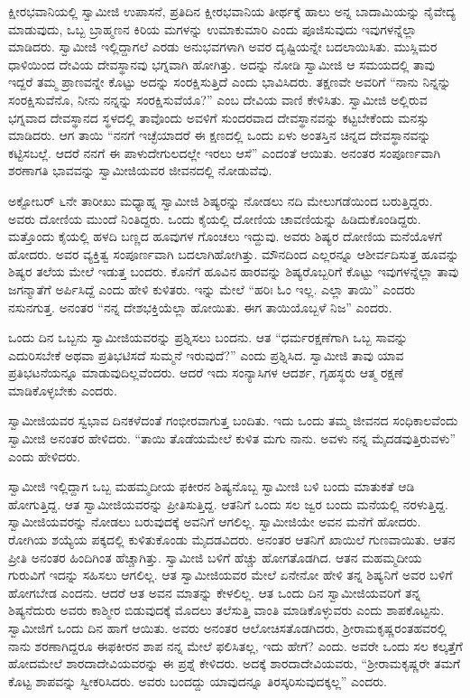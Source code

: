 \vskip 2pt

 ಕ್ಷೀರಭವಾನಿಯಲ್ಲಿ ಸ್ವಾಮೀಜಿ ಉಪಾಸನೆ, ಪ್ರತಿದಿನ ಕ್ಷೀರಭವಾನಿಯ ತೀರ್ಥಕ್ಕೆ ಹಾಲು ಅನ್ನ ಬಾದಾಮಿಯನ್ನು ನೈವೇದ್ಯ ಮಾಡುವುದು, ಒಬ್ಬ ಬ್ರಾಹ್ಮಣನ ಕಿರಿಯ ಮಗಳನ್ನು ಉಮಾಕುಮಾರಿ ಎಂದು ಪೂಜಿಸುವುದು ಇವುಗಳನ್ನೆಲ್ಲಾ ಮಾಡಿದರು. ಸ್ವಾಮೀಜಿ ಇಲ್ಲಿದ್ದಾಗಲೆ ಎರಡು ಅನುಭವಗಳಾಗಿ ಅವರ ದೃಷ್ಟಿಯನ್ನೇ ಬದಲಾಯಿಸಿತು. ಮುಸ್ಲಿಮರ ಧಾಳಿಯಿಂದ ದೇವಿಯ ದೇವಸ್ಥಾನವು ಭಗ್ನವಾಗಿ ಹೋಗಿತ್ತು. ಅದನ್ನು ನೋಡಿ ಸ್ವಾಮೀಜಿ ಆ ಸಮಯದಲ್ಲಿ ತಾವು ಇದ್ದರೆ ತಮ್ಮ ಪ್ರಾಣವನ್ನೇ ಕೊಟ್ಟು ಅದನ್ನು ಸಂರಕ್ಷಿಸುತ್ತಿದೆ ಎಂದು ಭಾವಿಸಿದರು. ತಕ್ಷಣವೇ ಅವರಿಗೆ “ನಾನು ನಿನ್ನನ್ನು ಸಂರಕ್ಷಿಸುವೆನೊ, ನೀನು ನನ್ನನ್ನು ಸಂರಕ್ಷಿಸುವೆಯೊ?” ಎಂಬ ದೇವಿಯ ವಾಣಿ ಕೇಳಿಸಿತು. ಸ್ವಾಮೀಜಿ ಅಲ್ಲಿರುವ ಭಗ್ನವಾದ ದೇವಸ್ಥಾನದ ಸ್ಥಳದಲ್ಲಿ ತಾವೊಂದು ಅವಳಿಗೆ ಸುಂದರವಾದ ದೇವಸ್ಥಾನವನ್ನು ಕಟ್ಟಬೇಕೆಂದು ಮನಸ್ಸು ಮಾಡಿದರು. ಆಗ ತಾಯಿ “ನನಗೆ ಇಚ್ಛೆಯಾದರೆ ಈ ಕ್ಷಣದಲ್ಲಿ ಒಂದು ಏಳು ಅಂತಸ್ತಿನ ಚಿನ್ನದ ದೇವಸ್ಥಾನವನ್ನು ಕಟ್ಟಿಸಬಲ್ಲೆ. ಆದರೆ ನನಗೆ ಈ ಪಾಳುದೇಗುಲದಲ್ಲೇ ಇರಲು ಆಸೆ” ಎಂದಂತೆ ಆಯಿತು. ಅನಂತರ ಸಂಪೂರ್ಣವಾಗಿ ಶರಣಾಗತಿ ಭಾವವನ್ನು ಸ್ವಾಮೀಜಿಯವರ ಜೀವನದಲ್ಲಿ ನೋಡುವೆವು. 

\newpage

 ಅಕ್ಟೋಬರ್ ೬ನೇ ತಾರೀಖು ಮಧ್ಯಾಹ್ನ ಸ್ವಾಮೀಜಿ ಶಿಷ್ಯರನ್ನು ನೋಡಲು ನದಿ ಮೇಲುಗಡೆಯಿಂದ ಬರುತ್ತಿದ್ದರು. ಅವರು ದೋಣಿಯ ಮುಂದೆ ನಿಂತಿದ್ದರು. ಒಂದು ಕೈಯಲ್ಲಿ ದೋಣಿಯ ಚಾವಣಿಯನ್ನು ಹಿಡಿದುಕೊಂಡಿದ್ದರು. ಮತ್ತೊಂದು ಕೈಯಲ್ಲಿ ಹಳದಿ ಬಣ್ಣದ ಹೂವುಗಳ ಗೊಂಚಲು ಇದ್ದುವು. ಅವರು ಶಿಷ್ಯರ ದೋಣಿಯ ಮನೆಯೊಳಗೆ ಹೋದರು. ಅವರ ವ್ಯಕ್ತಿತ್ವ ಸಂಪೂರ್ಣವಾಗಿ ಬದಲಾಗಿಹೋಗಿತ್ತು. ಮೌನದಿಂದ ಎಲ್ಲರನ್ನೂ ಆಶೀರ್ವದಿಸುತ್ತ ಹೂವನ್ನು ಶಿಷ್ಯರ ತಲೆಯ ಮೇಲೆ ಇಡುತ್ತ ಬಂದರು. ಕೊನೆಗೆ ಹೂವಿನ ಹಾರವನ್ನು ಶಿಷ್ಯರೊಬ್ಬರಿಗೆ ಕೊಟ್ಟು ಇವುಗಳನ್ನೆಲ್ಲಾ ತಾವು ಜಗನ್ಮಾತೆಗೆ ಅರ್ಪಿಸಿದ್ದೆ ಎಂದು ಹೇಳಿ ಕುಳಿತರು. ಇನ್ನು ಮೇಲೆ “ಹರಿಃ ಓಂ ಇಲ್ಲ. ಎಲ್ಲಾ ತಾಯಿ” ಎಂದರು ನಸುನಗುತ್ತ. ಅನಂತರ “ನನ್ನ ದೇಶಭಕ್ತಿಯೆಲ್ಲಾ ಹೋಯಿತು. ಈಗ ತಾಯಿಯೊಬ್ಬಳೆ ನಿಜ” ಎಂದರು. 

 ಒಂದು ದಿನ ಒಬ್ಬನು ಸ್ವಾಮೀಜಿಯವರನ್ನು ಪ್ರಶ್ನಿಸಲು ಬಂದನು. ಆತ “ಧರ್ಮರಕ್ಷಣೆಗಾಗಿ ಒಬ್ಬ ಸಾವನ್ನು ಎದುರಿಸಬೇಕೆ ಅಥವಾ ಪ್ರತಿಭಟಿಸದೆ ಸುಮ್ಮನೆ ಇರುವುದೆ?” ಎಂದು ಪ್ರಶ್ನಿಸಿದ. ಸ್ವಾಮೀಜಿ ತಾವು ಯಾವ ಪ್ರತಿಭಟನೆಯನ್ನೂ ಮಾಡುವುದಿಲ್ಲವೆಂದರು. ಆದರೆ ಇದು ಸಂನ್ಯಾಸಿಗಳ ಆದರ್ಶ, ಗೃಹಸ್ಥರು ಆತ್ಮ ರಕ್ಷಣೆ ಮಾಡಿಕೊಳ್ಳಬೇಕು ಎಂದರು. 

 ಸ್ವಾಮೀಜಿಯವರ ಸ್ವಭಾವ ದಿನಕಳೆದಂತೆ ಗಂಭೀರವಾಗುತ್ತ ಬಂದಿತು. ಇದು ಒಂದು ತಮ್ಮ ಜೀವನದ ಸಂಧಿಕಾಲವೆಂದು ಸ್ವಾಮೀಜಿ ಅನಂತರ ಹೇಳಿದರು. “ತಾಯಿ ತೊಡೆಯಮೇಲೆ ಕುಳಿತ ಮಗು ನಾನು. ಅವಳು ನನ್ನ ಮೈದಡವುತ್ತಿರುವಳು” ಎಂದು ಹೇಳಿದರು. 

 ಸ್ವಾಮೀಜಿ ಇಲ್ಲಿದ್ದಾಗ ಒಬ್ಬ ಮಹಮ್ಮದೀಯ ಫಕೀರನ ಶಿಷ್ಯನೊಬ್ಬ ಸ್ವಾಮೀಜಿ ಬಳಿ ಬಂದು ಮಾತುಕತೆ ಆಡಿ ಹೋಗುತ್ತಿದ್ದ. ಆತ ಸ್ವಾಮೀಜಿಯವರನ್ನು ಪ್ರೀತಿಸುತ್ತಿದ್ದ. ಆತನಿಗೆ ಒಂದು ಸಲ ಜ್ವರ ಬಂದು ಮನೆಯಲ್ಲಿ ನರಳುತ್ತಿದ್ದ. ಸ್ವಾಮೀಜಿಯವರನ್ನು ನೋಡಲು ಬರುವುದಕ್ಕೆ ಅವನಿಗೆ ಆಗಲಿಲ್ಲ. ಸ್ವಾಮೀಜಿಯೇ ಅವನ ಮನೆಗೆ ಹೋದರು. ರೋಗಿಯ ಶಯ್ಯೆಯ ಪಕ್ಕದಲ್ಲಿ ಕುಳಿತುಕೊಂಡು ಮೈದಡವಿದರು. ಅನಂತರ ಆತನಿಗೆ ಖಾಯಿಲೆ ಗುಣವಾಯಿತು. ಆತನ ಪ್ರೀತಿ ಅನಂತರ ಹಿಂದಿಗಿಂತ ಹೆಚ್ಚಾಗಿತ್ತು. ಸ್ವಾಮೀಜಿ ಬಳಿಗೆ ಹೆಚ್ಚು ಹೋಗತೊಡಗಿದ. ಆತನ ಮಹಮ್ಮದೀಯ ಗುರುವಿಗೆ ಇದನ್ನು ಸಹಿಸಲು ಆಗಲಿಲ್ಲ. ಆತ ಸ್ವಾಮೀಜಿಯವರ ಮೇಲೆ ಏನೇನೋ ಹೇಳಿ ತನ್ನ ಶಿಷ್ಯನಿಗೆ ಅವರ ಬಳಿಗೆ ಹೋಗಬೇಡ ಎಂದನು. ಆದರೆ ಆತ ಅವನ ಮಾತನ್ನು ಕೇಳಲಿಲ್ಲ. ಆತ ಒಂದು ದಿನ ಸ್ವಾಮೀಜಿಯವರಿಗೆ ತನ್ನ ಶಿಷ್ಯನೆದುರು ಅವರು ಕಾಶ್ಮೀರ ಬಿಡುವುದಕ್ಕೆ ಮೊದಲು ತಲೆಸುತ್ತಿ ವಾಂತಿ ಮಾಡಿಕೊಳ್ಳುವರು ಎಂದು ಶಾಪಕೊಟ್ಟನು. ಸ್ವಾಮೀಜಿಗೆ ಒಂದು ದಿನ ಹಾಗೆ ಆಯಿತು. ಅವರು ಅನಂತರ ಆಲೋಚಿಸತೊಡಗಿದರು, ಶ‍್ರೀರಾಮಕೃಷ್ಣರಂತಹವರಲ್ಲಿ ನಾನು ಶರಣಾಗಿದ್ದರೂ ಈ\break ಫಕೀರನ ಶಾಪ ನನ್ನ ಮೇಲೆ ಫಲಿಸಿತಲ್ಲ, ಇದು ಹೇಗೆ? ಎಂದು. ಅವರೇ ಒಂದು ಸಲ ಕಲ್ಕತ್ತೆಗೆ ಹೋದಮೇಲೆ ಶಾರದಾದೇವಿಯವರನ್ನು ಈ ಪ್ರಶ್ನೆ ಕೇಳಿದರು. ಅದಕ್ಕೆ ಶಾರದಾದೇವಿಯವರು, “ಶ‍್ರೀರಾಮಕೃಷ್ಣರೇ ತಮಗೆ ಕೊಟ್ಟ ಶಾಪವನ್ನು ಸ್ವೀಕರಿಸಿದರು. ಅವರು ಬಂದದ್ದು ಯಾವುದನ್ನೂ ತಿರಸ್ಕರಿಸುವುದಕ್ಕಲ್ಲ” ಎಂದರು. 

